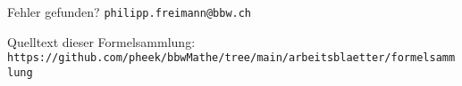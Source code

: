 
\newpage
{}

\vspace{5mm}

Fehler gefunden? \texttt{philipp.freimann@bbw.ch}

{\footnotesize Quelltext dieser Formelsammlung:\\
\texttt{https://github.com/pheek/bbwMathe/tree/main/arbeitsblaetter/formelsammlung}}






